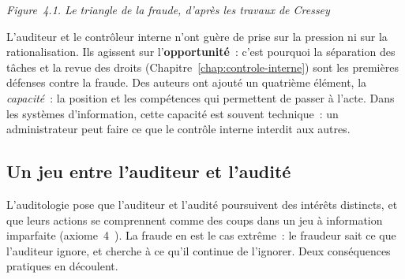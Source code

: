 \noindent\begin{minipage}{\linewidth}
\begin{center}
\end{center}
\vspace{-0.4em}
\begin{center}{\small\itshape Figure~4.1. Le triangle de la fraude, d'après
les travaux de Cressey}\end{center}
\end{minipage}

\medskip

L'auditeur et le contrôleur interne n'ont guère de prise sur la pression ni
sur la rationalisation. Ils agissent sur l'\textbf{opportunité}~: c'est
pourquoi la séparation des tâches et la revue des droits
(Chapitre~\ref{chap:controle-interne}) sont les premières défenses contre la
fraude. Des auteurs ont ajouté un quatrième élément, la \emph{capacité}~: la
position et les compétences qui permettent de passer à l'acte. Dans les
systèmes d'information, cette capacité est souvent technique~: un
administrateur peut faire ce que le contrôle interne interdit aux autres.

\subsection{Un jeu entre l'auditeur et l'audité}

L'auditologie pose que l'auditeur et l'audité poursuivent des intérêts
distincts, et que leurs actions se comprennent comme des coups dans un jeu
à information imparfaite (axiome~4~\cite{minka2026auditologie}). La fraude en
est le cas extrême~: le fraudeur sait ce que l'auditeur ignore, et cherche à
ce qu'il continue de l'ignorer. Deux conséquences pratiques en découlent.

